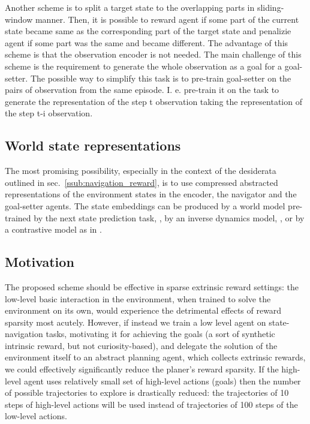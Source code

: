 \documentclass[acmsmall, nonacm]{acmart}
\begin{document}
Another scheme is to split a target state to the overlapping parts in sliding-window manner. Then, it is possible to reward agent if some part of the current state became same as the corresponding part of the target state and penalizie agent if some part was the same and became different. The advantage of this scheme is that the observation encoder is not needed. The main challenge of this scheme is the requirement to generate the whole observation as a goal for a goal-setter. The possible way to simplify this task is to pre-train goal-setter on the pairs of observation from the same episode. I. e. pre-train it on the task to generate the representation of the step t observation taking the representation of the step t-i observation.

\subsection{World state representations}

The most promising possibility, especially in the context of the desiderata outlined in sec.~\ref{ssub:navigation_reward}, is to use compressed abstracted representations of the environment states in the encoder, the navigator and the goal-setter agents. The state embeddings can be produced by a world model pre-trained by the next state prediction task, \citep{ha_recurrent_2018}, by an inverse dynamics model, \citep{badia_never_2020}, or by a contrastive model as in \citep{Ugadiarov2021LongTermEI}.

\subsection{Motivation}

The proposed scheme should be effective in sparse extrinsic reward settings: the low-level basic interaction in the environment, when trained to solve the environment on its own, would experience the detrimental effects of reward sparsity most acutely. However, if instead we train a low level agent on state-navigation tasks, motivating it for achieving the goals (a sort of synthetic intrinsic reward, but not curiosity-based), and delegate the solution of the environment itself to an abstract planning agent, which collects extrinsic rewards, we could effectively significantly reduce the planer's reward sparsity. If the high-level agent uses relatively small set of high-level actions (goals) then the number of possible trajectories to explore is drastically reduced: the trajectories of 10 steps of high-level actions will be used instead of trajectories of 100 steps of the low-level actions.
\end{document}
